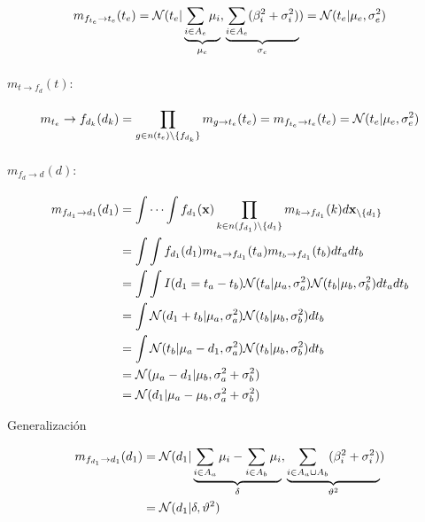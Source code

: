 \documentclass[11pt,twoside,spanish]{report} %
\begin{document}
\begin{equation}
	\centering
	m_{f_{t_e}\rightarrow t_e}(t_e)  = \mathcal{N}(t_e \vert \underbrace{\sum_{i\in A_e}\mu_i}_{ \mu_e},\underbrace{\sum_{i\in A_e}(\beta_i^2+\sigma_i^2)}_{\sigma_e})
	=\mathcal{N}(t_e \vert  \mu_e,\sigma_e^2)
\end{equation}

\paragraph{$m_{t\rightarrow f_{d}}(t):$}

\begin{equation}
	\centering
	m_{t_e}\rightarrow f_{d_k}(d_k) = \prod_{g\in n(t_e)\backslash\{f_{d_k}\}} m_{g\rightarrow t_e}(t_e)
	= m_{f_{t_e}\rightarrow t_e}(t_e)
	=  \mathcal{N}(t_e \vert  \mu_e,\sigma_e^2)
\end{equation}

\paragraph{$m_{f_{d}\rightarrow d}(d):$}

\begin{equation}
	\centering
	\begin{split}
		m_{f_{d_1}\rightarrow d_1}(d_1) & = \int\cdots\int f_{d_1}(\textbf{x})\prod_{k\in n(f_{d_1})\backslash\{d_1\}} m_{k\rightarrow f_{d_1}}(k)d\textbf{x}_{\backslash \{d_1\}} \\
		& = \int\int f_{d_1}(d_1)m_{t_a\rightarrow f_{d_1}}(t_a)m_{t_b\rightarrow f_{d_1}}(t_b)dt_adt_b\\
		& = \int\int I(d_1=t_a-t_b)\mathcal{N}(t_a \vert \mu_a,\sigma_a^2)\mathcal{N}(t_b \vert \mu_b,\sigma_b^2)dt_adt_b\\
		& =\int \mathcal{N}(d_1+t_b \vert \mu_a,\sigma_a^2)\mathcal{N}(t_b \vert \mu_b,\sigma_b^2)dt_b\\
		& =\int \mathcal{N}(t_b \vert \mu_a-d_1,\sigma_a^2)\mathcal{N}(t_b \vert \mu_b,\sigma_b^2)dt_b\\
		& =\mathcal{N}( \mu_a-d_1 \vert  \mu_b,\sigma_a^2+\sigma_b^2)\\
		& =\mathcal{N}(d_1 \vert  \mu_a-\mu_b,\sigma_a^2+\sigma_b^2)
	\end{split}
\end{equation}

Generalizaci\'on

\begin{equation}
	\centering
	\begin{split}
		m_{f_{d_1}\rightarrow d_1}(d_1)& = \mathcal{N}(d_1 \vert  \underbrace{\sum_{i\in A_a}\mu_i-\sum_{i\in A_b}\mu_i}_{\delta},\underbrace{\sum_{i\in A_a \cup A_b}(\beta_i^2+\sigma_i^2)}_{\vartheta^2})\\
		& =  \mathcal{N}(d_1 \vert  \delta,\vartheta^2)
	\end{split}
\end{equation}
\end{document}
